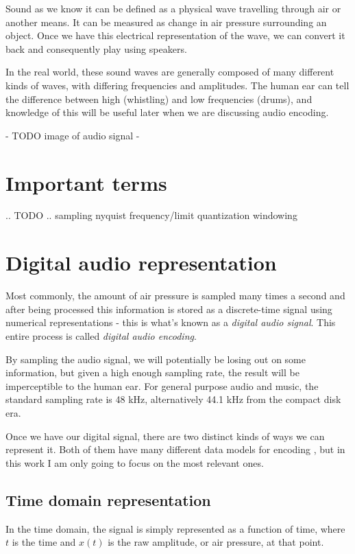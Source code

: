 Sound as we know it can be defined as a physical wave travelling through air or another means. \cite{you_2010} It can be measured as change in air pressure surrounding an object. Once we have this electrical representation of the wave, we can convert it back and consequently play using speakers.

In the real world, these sound waves are generally composed of many different kinds of waves, with differing frequencies and amplitudes. The human ear can tell the difference between high (whistling) and low frequencies (drums), and knowledge of this will be useful later when we are discussing audio encoding.

- TODO image of audio signal -

\section{Important terms}
.. TODO ..
sampling
nyquist frequency/limit
quantization
windowing

\section{Digital audio representation}
Most commonly, the amount of air pressure is sampled many times a second and after being processed this information is stored as a discrete-time signal using numerical representations - this is what's known as a \emph{digital audio signal}. This entire process is called \emph{digital audio encoding}.

By sampling the audio signal, we will potentially be losing out on some information, but given a high enough sampling rate, the result will be imperceptible to the human ear. For general purpose audio and music, the standard sampling rate is 48 kHz, alternatively 44.1 kHz from the compact disk era.

Once we have our digital signal, there are two distinct kinds of ways we can represent it. Both of them have many different data models for encoding \cite{you_2010}, but in this work I am only going to focus on the most relevant ones.

\subsection{Time domain representation}
In the time domain, the signal is simply represented as a function of time, where $t$ is the time and $x(t)$ is the raw amplitude, or air pressure, at that point. \cite{bosi_goldberg_2003}

